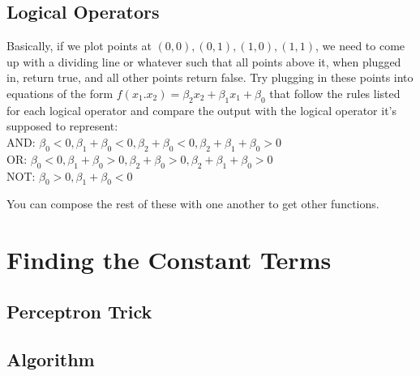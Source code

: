 \documentclass{article}
\begin{document}
\subsection{Logical Operators}
Basically, if we plot points at $(0, 0), (0, 1), (1, 0), (1, 1)$, we need to come up with a dividing line or whatever such that all points above it, when plugged in, return true, and all other points return false. Try plugging in these points into equations of the form $f(x_1.x_2) = \beta_2 x_2 + \beta_1 x_1 + \beta_0$ that follow the rules listed for each logical operator and compare the output with the logical operator it's supposed to represent:\\
AND: $\beta_0 < 0, \beta_1 + \beta_0 < 0, \beta_2 + \beta_0 < 0, \beta_2 + \beta_1 + \beta_0 > 0$ \\
OR: $\beta_0 < 0, \beta_1 + \beta_0 > 0, \beta_2 + \beta_0 > 0, \beta_2 + \beta_1 + \beta_0 > 0$ \\
NOT: $\beta_0 > 0, \beta_1 + \beta_0 < 0$

You can compose the rest of these with one another to get other functions.

\section{Finding the Constant Terms}

\subsection{Perceptron Trick}

\subsection{Algorithm}
\end{document}
